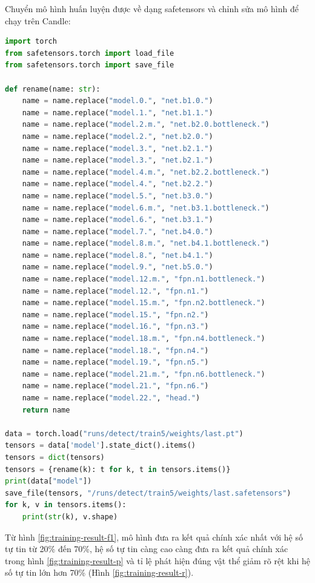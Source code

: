 Chuyển mô hình huấn luyện được về dạng safetensors và chỉnh sửa mô hình để chạy trên Candle:
\begin{lstlisting}[language=python]
import torch
from safetensors.torch import load_file
from safetensors.torch import save_file

def rename(name: str):
    name = name.replace("model.0.", "net.b1.0.")
    name = name.replace("model.1.", "net.b1.1.")
    name = name.replace("model.2.m.", "net.b2.0.bottleneck.")
    name = name.replace("model.2.", "net.b2.0.")
    name = name.replace("model.3.", "net.b2.1.")
    name = name.replace("model.3.", "net.b2.1.")
    name = name.replace("model.4.m.", "net.b2.2.bottleneck.")
    name = name.replace("model.4.", "net.b2.2.")
    name = name.replace("model.5.", "net.b3.0.")
    name = name.replace("model.6.m.", "net.b3.1.bottleneck.")
    name = name.replace("model.6.", "net.b3.1.")
    name = name.replace("model.7.", "net.b4.0.")
    name = name.replace("model.8.m.", "net.b4.1.bottleneck.")
    name = name.replace("model.8.", "net.b4.1.")
    name = name.replace("model.9.", "net.b5.0.")
    name = name.replace("model.12.m.", "fpn.n1.bottleneck.")
    name = name.replace("model.12.", "fpn.n1.")
    name = name.replace("model.15.m.", "fpn.n2.bottleneck.")
    name = name.replace("model.15.", "fpn.n2.")
    name = name.replace("model.16.", "fpn.n3.")
    name = name.replace("model.18.m.", "fpn.n4.bottleneck.")
    name = name.replace("model.18.", "fpn.n4.")
    name = name.replace("model.19.", "fpn.n5.")
    name = name.replace("model.21.m.", "fpn.n6.bottleneck.")
    name = name.replace("model.21.", "fpn.n6.")
    name = name.replace("model.22.", "head.")
    return name

data = torch.load("runs/detect/train5/weights/last.pt")
tensors = data['model'].state_dict().items()
tensors = dict(tensors)
tensors = {rename(k): t for k, t in tensors.items()}
print(data["model"])
save_file(tensors, "/runs/detect/train5/weights/last.safetensors")
for k, v in tensors.items():
    print(str(k), v.shape)
\end{lstlisting}

Từ hình \ref{fig:training-result-f1}, mô hình đưa ra kết quả chính xác nhất với hệ số tự tin từ 20\% đến 70\%, hệ số tự tin càng cao càng đưa ra kết quả chính xác trong hình \ref{fig:training-result-p} và tỉ lệ phát hiện đúng vật thể giảm rõ rệt khi hệ số tự tin lớn hơn 70\% (Hình \ref{fig:training-result-r}).

